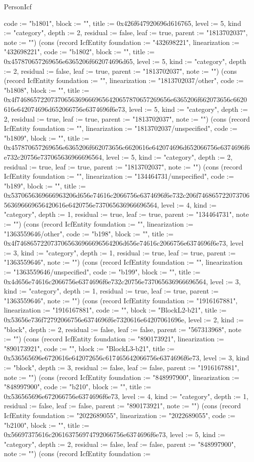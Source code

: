 \begin{lexlean}{PersonIcf}
\begin{semanticmodule}
{code := "b1801", block := "", title := 0x426f647920696d616765, level := 5, kind := "category", depth := 2, residual := false, leaf := true, parent := "1813702037", note := ""}) (cons (record IcfEntity {foundation := "432698221", linearization := "432698221", code := "b1802", block := "", title := 0x457870657269656e6365206f662074696d65, level := 5, kind := "category", depth := 2, residual := false, leaf := true, parent := "1813702037", note := ""}) (cons (record IcfEntity {foundation := "", linearization := "1813702037/other", code := "b1808", block := "", title := 0x4f746865722073706563696669656420657870657269656e6365206f662073656c6620616e642074696d652066756e6374696f6e73, level := 5, kind := "category", depth := 2, residual := true, leaf := true, parent := "1813702037", note := ""}) (cons (record IcfEntity {foundation := "", linearization := "1813702037/unspecified", code := "b1809", block := "", title := 0x457870657269656e6365206f662073656c6620616e642074696d652066756e6374696f6e732c20756e737065636966696564, level := 5, kind := "category", depth := 2, residual := true, leaf := true, parent := "1813702037", note := ""}) (cons (record IcfEntity {foundation := "", linearization := "134464731/unspecified", code := "b189", block := "", title := 0x5370656369666963206d656e74616c2066756e6374696f6e732c206f746865722073706563696669656420616e6420756e737065636966696564, level := 4, kind := "category", depth := 1, residual := true, leaf := true, parent := "134464731", note := ""}) (cons (record IcfEntity {foundation := "", linearization := "1363559646/other", code := "b198", block := "", title := 0x4f7468657220737065636966696564206d656e74616c2066756e6374696f6e73, level := 3, kind := "category", depth := 1, residual := true, leaf := true, parent := "1363559646", note := ""}) (cons (record IcfEntity {foundation := "", linearization := "1363559646/unspecified", code := "b199", block := "", title := 0x4d656e74616c2066756e6374696f6e732c20756e737065636966696564, level := 3, kind := "category", depth := 1, residual := true, leaf := true, parent := "1363559646", note := ""}) (cons (record IcfEntity {foundation := "1916167881", linearization := "1916167881", code := "", block := "BlockL2-b21", title := 0x53656e736f72792066756e6374696f6e7320616e64207061696e, level := 2, kind := "block", depth := 2, residual := false, leaf := false, parent := "567313968", note := ""}) (cons (record IcfEntity {foundation := "890173921", linearization := "890173921", code := "", block := "BlockL3-b21", title := 0x536565696e6720616e642072656c617465642066756e6374696f6e73, level := 3, kind := "block", depth := 3, residual := false, leaf := false, parent := "1916167881", note := ""}) (cons (record IcfEntity {foundation := "848997900", linearization := "848997900", code := "b210", block := "", title := 0x536565696e672066756e6374696f6e73, level := 4, kind := "category", depth := 1, residual := false, leaf := false, parent := "890173921", note := ""}) (cons (record IcfEntity {foundation := "2022689055", linearization := "2022689055", code := "b2100", block := "", title := 0x56697375616c206163756974792066756e6374696f6e73, level := 5, kind := "category", depth := 2, residual := false, leaf := false, parent := "848997900", note := ""}) (cons (record IcfEntity {foundation := }
\end{semanticmodule}
\end{lexlean}
